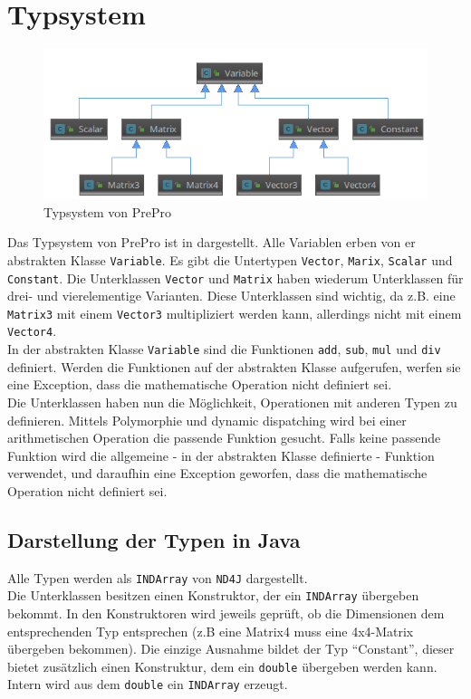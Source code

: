 \section{Typsystem}
\begin{figure}
	\centering
	\includegraphics[width=\textwidth]{figures/typsystem}
	\caption{Typsystem von PrePro}
	\label{fig:Typsystem}
\end{figure}
Das Typsystem von PrePro ist in  dargestellt.
Alle Variablen erben von er abstrakten Klasse \texttt{Variable}.
Es gibt die Untertypen \texttt{Vector}, \texttt{Marix}, \texttt{Scalar} und \texttt{Constant}.
Die Unterklassen \texttt{Vector} und \texttt{Matrix} haben wiederum Unterklassen für drei- und vierelementige Varianten.
Diese Unterklassen sind wichtig, da z.B. eine \texttt{Matrix3} mit einem \texttt{Vector3} multipliziert werden kann, allerdings nicht mit einem \texttt{Vector4}.\\
In der abstrakten Klasse \texttt{Variable} sind die Funktionen \texttt{add}, \texttt{sub}, \texttt{mul} und \texttt{div} definiert.
Werden die Funktionen auf der abstrakten Klasse aufgerufen, werfen sie eine Exception, dass die mathematische Operation nicht definiert sei.\\
Die Unterklassen haben nun die Möglichkeit, Operationen mit anderen Typen zu definieren.
Mittels Polymorphie und dynamic dispatching wird bei einer arithmetischen Operation die passende Funktion gesucht.
Falls keine passende Funktion wird die allgemeine - in der abstrakten Klasse definierte - Funktion verwendet, und daraufhin eine Exception geworfen, dass die mathematische Operation nicht definiert sei.

\subsection{Darstellung der Typen in Java}
Alle Typen werden als \texttt{INDArray} von \texttt{ND4J} dargestellt.\\
Die Unterklassen besitzen einen Konstruktor, der ein \texttt{INDArray} übergeben bekommt.
In den Konstruktoren wird jeweils geprüft, ob die Dimensionen dem entsprechenden Typ entsprechen (z.B eine Matrix4 muss eine 4x4-Matrix übergeben bekommen).
Die einzige Ausnahme bildet der Typ ``Constant'', dieser bietet zusätzlich einen Konstruktur, dem ein \texttt{double} übergeben werden kann.
Intern wird aus dem \texttt{double} ein \texttt{INDArray} erzeugt.


